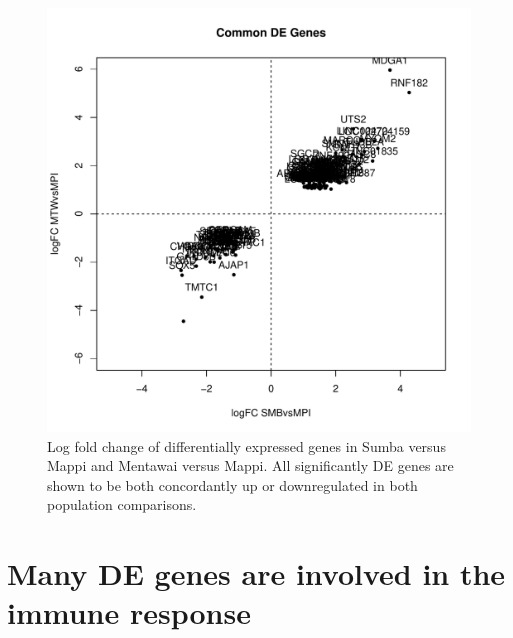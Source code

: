 \documentclass[12pt,a4paper,titlepage,twoside,openright]{book}
\begin{document}
\begin{mainmatter}
{{{\begin{figure}[htb!]
\centering
\includegraphics[width=\textwidth,height=\textheight,keepaspectratio]{Figures/logFC_commonMPIgenes_dupCor.pdf}
\caption{Log fold change of differentially expressed genes in Sumba versus Mappi and Mentawai versus Mappi. All significantly DE genes are shown to be both concordantly up or downregulated in both population comparisons.}
\label{fig:LogFC: Mappi vs Others}
\end{figure}

\section{Many DE genes are involved in the immune response}

}}}
\end{mainmatter}
\end{document}

